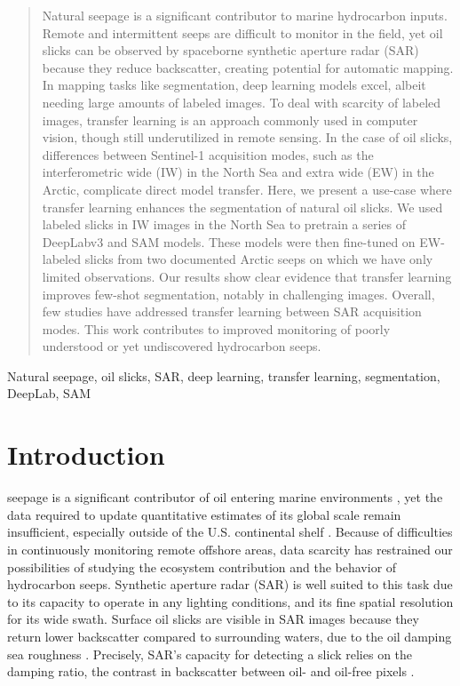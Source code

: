 \documentclass[lettersize,journal]{IEEEtran}
\begin{document}
\begin{abstract} 
    Natural seepage is a significant contributor to marine hydrocarbon inputs. 
    Remote and intermittent seeps are difficult to monitor in the field, yet oil slicks can be observed by spaceborne synthetic aperture radar (SAR) because they reduce backscatter, 
    creating potential for automatic mapping. In mapping tasks like segmentation, deep learning models excel, albeit needing large amounts of labeled images.
    To deal with scarcity of labeled images, transfer learning is an approach commonly used in computer vision, though still underutilized in remote sensing. In the case of oil slicks, 
    differences between Sentinel-1 acquisition modes, such as the interferometric wide (IW) in the North Sea and extra wide (EW) in the Arctic, complicate direct model transfer.
    Here, we present a use-case where transfer learning enhances the segmentation of natural oil slicks. We used labeled slicks in IW images in the North Sea to pretrain a series of DeepLabv3 and SAM models. 
    These models were then fine-tuned on EW-labeled slicks from two documented Arctic seeps on which we have only limited observations. Our results show clear evidence that transfer learning improves few-shot 
    segmentation, notably in challenging images. Overall, few studies have addressed transfer learning between SAR acquisition modes. This work contributes to improved monitoring of poorly 
    understood or yet undiscovered hydrocarbon seeps. 
\end{abstract}

\begin{IEEEkeywords}
    Natural seepage, oil slicks, SAR, deep learning, transfer learning, segmentation, DeepLab, SAM
\end{IEEEkeywords}

\section{Introduction}
 seepage is a significant contributor of oil entering marine environments \cite{kvenvoldenNaturalSeepageCrude2003}, yet the data required to update quantitative
estimates of its global scale remain insufficient, especially outside of the U.S. continental shelf \cite{nationalacademiesofsciencesengineeringandmedicineOilSeaIV2022}. Because of difficulties in continuously monitoring 
remote offshore areas, data scarcity has restrained our possibilities of studying the ecosystem contribution and the behavior of hydrocarbon seeps. 
Synthetic aperture radar (SAR) is well suited to this task due to its capacity to operate in any lighting conditions, and its fine spatial resolution for its wide swath. 
Surface oil slicks are visible in SAR images because they return lower backscatter compared to surrounding waters, due to the oil damping sea roughness \cite{brekkeSAROilSpill2020,fingasReviewOilSpill2018,alpersOilsSurfactants2004}.
Precisely, SAR's capacity for detecting a slick relies on the damping ratio, the contrast in backscatter between oil- and oil-free pixels \cite{hovlandSlickDetectionSAR1994,
quigleyInvestigationDampingRatio2023}.
\end{document}
